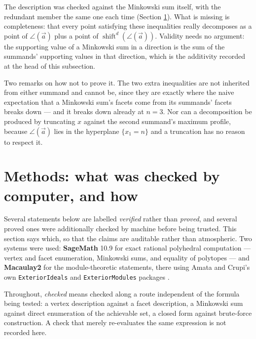 \documentclass[11pt, a4paper, abstract=yes]{scrartcl}
\theoremstyle{definition}
\theoremstyle{remark}
\theoremstyle{plain}
\newcommand{\shift}{\operatorname{shift}}
\newcommand{\rasimp}{\angle}
\begin{document}
The description was checked against the Minkowski sum itself, with the redundant member the same one
each time (Section \ref{sec-methods}). What is missing is completeness: that every point satisfying these inequalities really
decomposes as a point of \(\rasimp(\vec a)\) plus a point of \(\shift^d(\rasimp(\vec a))\). Validity needs no
argument: the supporting value of a Minkowski sum in a direction is the sum of the summands'
supporting values in that direction, which is the additivity recorded at the head of this
subsection.

Two remarks on how not to prove it. The two extra inequalities are not inherited from either summand
and cannot be, since they are exactly where the naive expectation that a Minkowski sum's facets come
from its summands' facets breaks down --- and it breaks down already at \(n=3\). Nor can a
decomposition be produced by truncating \(x\) against the second summand's maximum profile, because
\(\rasimp(\vec a)\) lies in the hyperplane \(\lbrace x_1=n\rbrace\) and a truncation has no reason to
respect it.
\section{Methods: what was checked by computer, and how}
\label{sec-methods}
Several statements below are labelled \emph{verified} rather than \emph{proved}, and several proved ones were
additionally checked by machine before being trusted. This section says which, so that the claims
are auditable rather than atmospheric. Two systems were used: \textbf{\textbf{SageMath}} 10.9 for exact rational
polyhedral computation --- vertex and facet enumeration, Minkowski sums, and equality of polytopes
--- and \textbf{\textbf{Macaulay2}} for the module-theoretic statements, there using Amata and Crupi's own
\texttt{ExteriorIdeals} and \texttt{ExteriorModules} packages
\autocite{SageMath,Macaulay2,AmataCrupi2018ExteriorIdeals,AmataCrupi2021}.

Throughout, \emph{checked} means checked along a route independent of the formula being tested: a vertex
description against a facet description, a Minkowski sum against direct enumeration of the
achievable set, a closed form against brute-force construction. A check that merely re-evaluates
the same expression is not recorded here.
\end{document}
